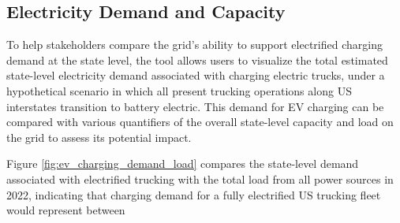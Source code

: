 \subsection{Electricity Demand and Capacity}

To help stakeholders compare the grid's ability to support electrified charging demand at the state level, the tool allows users to visualize the total estimated state-level electricity demand associated with charging electric trucks, under a hypothetical scenario in which all present trucking operations along US interstates transition to battery electric. This demand for EV charging can be compared with various quantifiers of the overall state-level capacity and load on the grid to assess its potential impact. 

Figure \ref{fig:ev_charging_demand_load} compares the state-level demand associated with electrified trucking with the total load from all power sources in 2022, indicating that charging demand for a fully electrified US trucking fleet would represent between 


